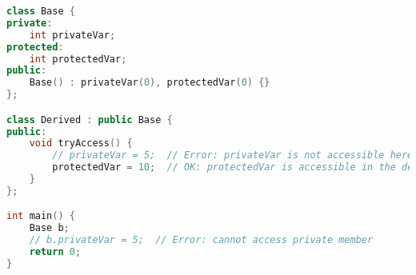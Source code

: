 \begin{lstlisting}[language=C++]
class Base {
private:
    int privateVar;
protected:
    int protectedVar;
public:
    Base() : privateVar(0), protectedVar(0) {}
};

class Derived : public Base {
public:
    void tryAccess() {
        // privateVar = 5;  // Error: privateVar is not accessible here
        protectedVar = 10;  // OK: protectedVar is accessible in the derived class
    }
};

int main() {
    Base b;
    // b.privateVar = 5;  // Error: cannot access private member
    return 0;
}
\end{lstlisting}

%
%
%
%
%
%
%
%
